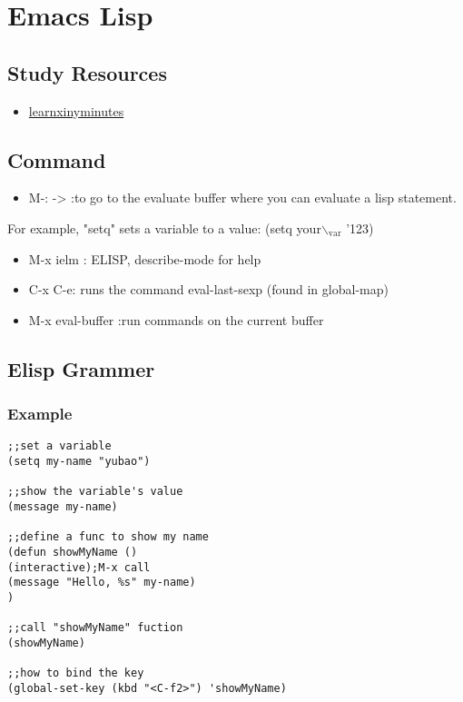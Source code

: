\documentclass[11pt]{article}
\begin{document}
\section{Emacs Lisp}
\label{sec:org46b4aba}
\subsection{Study Resources}
\label{sec:org78139e1}
\begin{itemize}
\item \href{https://learnxinyminutes.com/}{learnxinyminutes}
\end{itemize}
\subsection{Command}
\label{sec:orgacdecc6}
\begin{itemize}
\item M-: -> :to go to the evaluate buffer where you can evaluate a lisp statement.
\end{itemize}
For example, "setq" sets a variable to a value: (setq your$\backslash$\(_{\text{var}}\) '123)

\begin{itemize}
\item M-x ielm : ELISP, describe-mode for help
\item C-x C-e:  runs the command eval-last-sexp (found in global-map)
\item M-x eval-buffer :run commands on the current buffer
\end{itemize}
\subsection{Elisp Grammer}
\label{sec:org316d97f}
\subsubsection{Example}
\label{sec:orgae17ab6}
\begin{verbatim}
;;set a variable
(setq my-name "yubao")

;;show the variable's value
(message my-name)

;;define a func to show my name
(defun showMyName ()
(interactive);M-x call
(message "Hello, %s" my-name)
)

;;call "showMyName" fuction
(showMyName)

;;how to bind the key
(global-set-key (kbd "<C-f2>") 'showMyName)

\end{verbatim}
\end{document}
